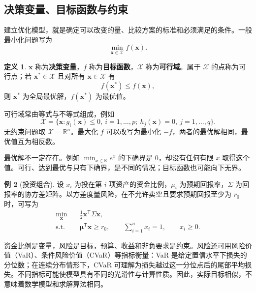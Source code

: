 \documentclass[UTF8,fontset=fandol,a4paper,12pt]{ctexart}
\newcommand{\R}{\mathbb R}
\newcommand{\vx}{\boldsymbol x}
\theoremstyle{definition}
\newtheorem{definition}{定义}[section]
\newtheorem{example}[definition]{例}
\begin{document}
\subsection{决策变量、目标函数与约束}
建立优化模型，就是确定可以改变的量、比较方案的标准和必须满足的条件。一般最小化问题写为
\begin{equation}\label{eq:optimization}
 \boxed{\min_{\vx\in\mathcal X} f(\vx).}
\end{equation}
\begin{definition}
$\vx$ 称为\textbf{决策变量}，$f$ 称为\textbf{目标函数}，$\mathcal X$ 称为\textbf{可行域}。属于 $\mathcal X$ 的点称为可行点；若 $\vx^*\in\mathcal X$ 且对所有 $\vx\in\mathcal X$ 有
\[
 f(\vx^*)\le f(\vx),
\]
则 $\vx^*$ 为全局最优解，$f(\vx^*)$ 为最优值。
\end{definition}
可行域常由等式与不等式组成，例如
\[
 \mathcal X=\{\vx:g_i(\vx)\le0,\ i=1,\ldots,p;
 \ h_j(\vx)=0,\ j=1,\ldots,q\}.
\]
无约束问题取 $\mathcal X=\R^n$。最大化 $f$ 可以改写为最小化 $-f$，两者的最优解相同，最优值互为相反数。

最优解不一定存在。例如 $\min_{x\in\R}e^x$ 的下确界是 $0$，却没有任何有限 $x$ 取得这个值。可行、达到最优与只有下确界，是不同的情况；目标函数也可能向下无界。

\begin{example}[投资组合]
设 $x_i$ 为投在第 $i$ 项资产的资金比例，$\mu_i$ 为预期回报率，$\Sigma$ 为回报率的协方差矩阵。以方差度量风险，在不允许卖空且要求预期回报至少为 $r_0$ 时，可写为
\[
 \begin{aligned}
 \min_{\vx}\quad&\frac12\vx^{\mathsf T}\Sigma\vx,\\
 \text{s.t.}\quad&\boldsymbol\mu^{\mathsf T}\vx\ge r_0,\qquad
 \sum_{i=1}^n x_i=1,\qquad x_i\ge0.
 \end{aligned}
\]
\end{example}
资金比例是变量，风险是目标，预算、收益和非负要求是约束。风险还可用风险价值（VaR）、条件风险价值（CVaR）等指标衡量：VaR 是给定置信水平下损失的分位数；在连续分布情形下，CVaR 可理解为损失越过这一分位点后的尾部平均损失。不同指标可能使模型具有不同的光滑性与计算性质。因此，实际目标相似，不意味着数学模型和求解算法相同。
\end{document}
